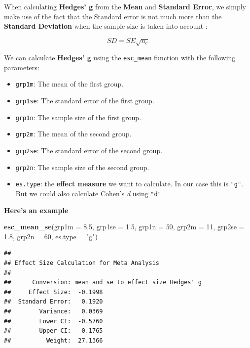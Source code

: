 \documentclass[]{book}
\newenvironment{Shaded}{\begin{snugshade}}{\end{snugshade}}
\newcommand{\DataTypeTok}[1]{\textcolor[rgb]{0.13,0.29,0.53}{#1}}
\newcommand{\DecValTok}[1]{\textcolor[rgb]{0.00,0.00,0.81}{#1}}
\newcommand{\FloatTok}[1]{\textcolor[rgb]{0.00,0.00,0.81}{#1}}
\newcommand{\KeywordTok}[1]{\textcolor[rgb]{0.13,0.29,0.53}{\textbf{#1}}}
\newcommand{\NormalTok}[1]{#1}
\newcommand{\StringTok}[1]{\textcolor[rgb]{0.31,0.60,0.02}{#1}}
\providecommand{\tightlist}{%
  \setlength{\itemsep}{0pt}\setlength{\parskip}{0pt}}
\begin{document}
When calculating \textbf{Hedges' g} from the \textbf{Mean} and \textbf{Standard Error}, we simply make use of the fact that the Standard error is not much more than the \textbf{Standard Deviation} when the sample size is taken into account \citep{thalheimer2002calculate}:

\[SD = SE\sqrt{n_c}\]

We can calculate \textbf{Hedges' g} using the \texttt{esc\_mean} function with the following parameters:

\begin{itemize}
\tightlist
\item
  \texttt{grp1m}: The mean of the first group.
\item
  \texttt{grp1se}: The standard error of the first group.
\item
  \texttt{grp1n}: The sample size of the first group.
\item
  \texttt{grp2m}: The mean of the second group.
\item
  \texttt{grp2se}: The standard error of the second group.
\item
  \texttt{grp2n}: The sample size of the second group.
\item
  \texttt{es.type}: the \textbf{effect measure} we want to calculate. In our case this is \texttt{"g"}. But we could also calculate Cohen's \emph{d} using \texttt{"d"}.
\end{itemize}

\textbf{Here's an example}

\begin{Shaded}
\begin{Highlighting}[]
\KeywordTok{esc_mean_se}\NormalTok{(}\DataTypeTok{grp1m =} \FloatTok{8.5}\NormalTok{, }\DataTypeTok{grp1se =} \FloatTok{1.5}\NormalTok{, }\DataTypeTok{grp1n =} \DecValTok{50}\NormalTok{,}
  \DataTypeTok{grp2m =} \DecValTok{11}\NormalTok{, }\DataTypeTok{grp2se =} \FloatTok{1.8}\NormalTok{, }\DataTypeTok{grp2n =} \DecValTok{60}\NormalTok{, }\DataTypeTok{es.type =} \StringTok{"g"}\NormalTok{)}
\end{Highlighting}
\end{Shaded}

\begin{verbatim}
## 
## Effect Size Calculation for Meta Analysis
## 
##      Conversion: mean and se to effect size Hedges' g
##     Effect Size:  -0.1998
##  Standard Error:   0.1920
##        Variance:   0.0369
##        Lower CI:  -0.5760
##        Upper CI:   0.1765
##          Weight:  27.1366
\end{verbatim}
\end{document}
